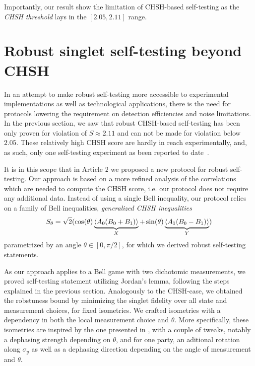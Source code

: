 Importantly, our result show the limitation of CHSH-based self-testing as the \textit{CHSH threshold} lays in the $[2.05,2.11]$ range.


\section{Robust singlet self-testing beyond CHSH}

In an attempt to make robust self-testing more accessible to experimental implementations as well as technological applications, there is the need for protocols lowering the requirement on detection efficiencies and noise limitations.
In the previous section, we saw that robust CHSH-based self-testing has been only proven for violation of $S\approx 2.11$ and can not be made for violation below $2.05$.
These relatively high CHSH score are hardly in reach experimentally, and, as such, only one self-testing experiment as been reported to date~\cite{Bancal2021}.

It is in this scope that in Article 2 we proposed a new protocol for robust self-testing.
Our approach is based on a more refined analysis of the correlations which are needed to compute the CHSH score, i.e. our protocol does not require any additional data.
Instead of using a single Bell inequality, our protocol relies on a family of Bell inequalities, \textit{generalized CHSH inequalities}
\begin{equation}
S_\theta = \sqrt{2}(\cos(\theta) \underbrace{\langle {A_0(B_0+B_1)} \rangle}_{X} + \sin(\theta)\underbrace{\langle {A_1(B_0-B_1)} \rangle}_{Y})
	\label{eq:}
\end{equation}
parametrized by an angle $\theta \in [0,\pi/2]$, for which we derived robust self-testing statements.

As our approach applies to a Bell game with two dichotomic measurements, we proved self-testing statement utilizing Jordan's lemma, following the steps explained in the previous section. 
Analogously to the CHSH-case, we obtained the robstuness bound by minimizing the singlet fidelity over all state and measurement choices, for fixed isometries.
We crafted isometries with a dependency in both the local measurement choice and $\theta$.
More specifically, these isometries are inspired by the one presented in , with a couple of tweaks, notably a dephasing strength depending on $\theta$, and for one party, an aditional rotation along $\sigma_y$ as well as a dephasing direction depending on the angle of measurement and $\theta$.

